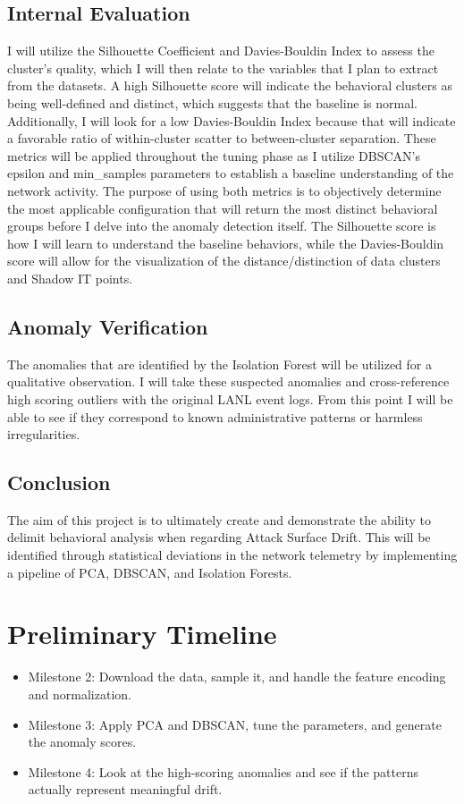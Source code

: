 \documentclass[conference]{IEEEtran}
\begin{document}
\subsection{Internal Evaluation}
I will utilize the Silhouette Coefficient and Davies-Bouldin Index to assess the cluster's quality, which I will then relate to the variables that I plan to extract from the datasets. A high Silhouette score will indicate the behavioral clusters as being well-defined and distinct, which suggests that the baseline is normal. Additionally, I will look for a low Davies-Bouldin Index because that will indicate a favorable ratio of within-cluster scatter to between-cluster separation. These metrics will be applied throughout the tuning phase as I utilize DBSCAN's epsilon and min\_samples parameters to establish a baseline understanding of the network activity. The purpose of using both metrics is to objectively determine the most applicable configuration that will return the most distinct behavioral groups before I delve into the anomaly detection itself. The Silhouette score is how I will learn to understand the baseline behaviors, while the Davies-Bouldin score will allow for the visualization of the distance/distinction of data clusters and Shadow IT points. 

\subsection{Anomaly Verification}
The anomalies that are identified by the Isolation Forest will be utilized for a qualitative observation. I will take these suspected anomalies and cross-reference high scoring outliers with the original LANL event logs. From this point I will be able to see if they correspond to known administrative patterns or harmless irregularities. 

\subsection{Conclusion}
The aim of this project is to ultimately create and demonstrate the ability to delimit behavioral analysis when regarding Attack Surface Drift. This will be identified through statistical deviations in the network telemetry by implementing a pipeline of PCA, DBSCAN, and Isolation Forests.  

\section{Preliminary Timeline}
\begin{itemize}
    \item Milestone 2: Download the data, sample it, and handle the feature encoding and normalization.
    \item Milestone 3: Apply PCA and DBSCAN, tune the parameters, and generate the anomaly scores.
    \item Milestone 4: Look at the high-scoring anomalies and see if the patterns actually represent meaningful drift.
\end{itemize}
\end{document}
